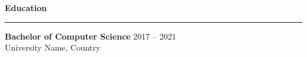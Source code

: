 \documentclass[10pt,letterpaper]{article}
\newenvironment{rSection}[1]{
\vspace{0.4em}
{\sffamily\bfseries\Large #1}
\smallskip
\hrule
\vspace{0.3em}
\begin{list}{}{\setlength{\leftmargin}{0em}}
\item[]
}{
\end{list}
}
\begin{document}
\vspace{10pt}

\begin{rSection}{Education}

\textbf{Bachelor of Computer Science} \hfill 2017 -- 2021 \\
University Name, Country

\end{rSection}
\end{document}
